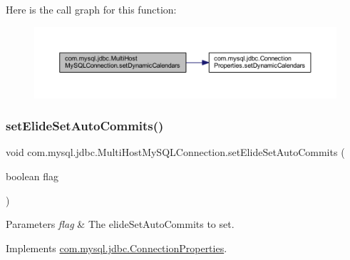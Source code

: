 Here is the call graph for this function\+:
\nopagebreak
\begin{figure}[H]
\begin{center}
\leavevmode
\includegraphics[width=350pt]{classcom_1_1mysql_1_1jdbc_1_1_multi_host_my_s_q_l_connection_affcca6d6db55ca52fb6b29fdba761ca8_cgraph}
\end{center}
\end{figure}
\mbox{\label{classcom_1_1mysql_1_1jdbc_1_1_multi_host_my_s_q_l_connection_a35d47c30cf0ef068eea0302f63e99226}} 
\subsubsection{\texorpdfstring{set\+Elide\+Set\+Auto\+Commits()}{setElideSetAutoCommits()}}
{\footnotesize\ttfamily void com.\+mysql.\+jdbc.\+Multi\+Host\+My\+S\+Q\+L\+Connection.\+set\+Elide\+Set\+Auto\+Commits (\begin{DoxyParamCaption}\item[{boolean}]{flag }\end{DoxyParamCaption})}


\begin{DoxyParams}{Parameters}
{\em flag} & The elide\+Set\+Auto\+Commits to set. \\
\hline
\end{DoxyParams}


Implements \mbox{\hyperlink{interfacecom_1_1mysql_1_1jdbc_1_1_connection_properties_ae95924c9d1da3b93b44b58b33089d251}{com.\+mysql.\+jdbc.\+Connection\+Properties}}.

